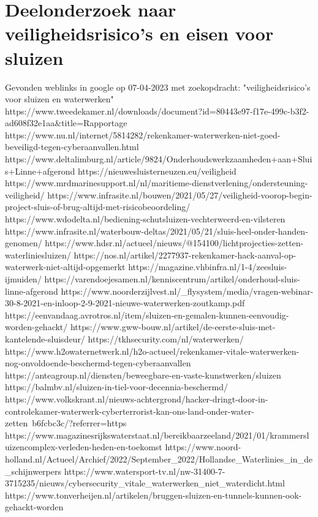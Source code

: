 \chapter{Deelonderzoek naar veiligheidsrisico's en eisen voor sluizen}

Gevonden weblinks in google op 07-04-2023 met zoekopdracht: "veiligheidsrisico's voor sluizen en waterwerken"
https://www.tweedekamer.nl/downloads/document?id=80443e97-f17e-499c-b3f2-ad608f32e1aa&title=Rapportage%
https://www.nu.nl/internet/5814282/rekenkamer-waterwerken-niet-goed-beveiligd-tegen-cyberaanvallen.html
https://www.deltalimburg.nl/article/9824/Onderhoudswerkzaamheden+aan+Sluis+Linne+afgerond
https://nieuwesluisterneuzen.eu/veiligheid
https://www.mrdmarinesupport.nl/nl/maritieme-dienstverlening/ondersteuning-veiligheid/
https://www.infrasite.nl/bouwen/2021/05/27/veiligheid-voorop-begin-project-sluis-of-brug-altijd-met-risicobeoordeling/
https://www.wdodelta.nl/bediening-schutsluizen-vechterweerd-en-vilsteren
https://www.infrasite.nl/waterbouw-deltas/2021/05/21/sluis-heel-onder-handen-genomen/
https://www.hdsr.nl/actueel/nieuws/@154100/lichtprojecties-zetten-waterliniesluizen/
https://nos.nl/artikel/2277937-rekenkamer-hack-aanval-op-waterwerk-niet-altijd-opgemerkt
https://magazine.vhbinfra.nl/1-4/zeesluis-ijmuiden/
https://varendoejesamen.nl/kenniscentrum/artikel/onderhoud-sluis-linne-afgerond
https://www.noorderzijlvest.nl/_flysystem/media/vragen-webinar-30-8-2021-en-inloop-2-9-2021-nieuwe-waterwerken-zoutkamp.pdf
https://eenvandaag.avrotros.nl/item/sluizen-en-gemalen-kunnen-eenvoudig-worden-gehackt/
https://www.gww-bouw.nl/artikel/de-eerste-sluis-met-kantelende-sluisdeur/
https://tkhsecurity.com/nl/waterwerken/
https://www.h2owaternetwerk.nl/h2o-actueel/rekenkamer-vitale-waterwerken-nog-onvoldoende-beschermd-tegen-cyberaanvallen
https://anteagroup.nl/diensten/beweegbare-en-vaste-kunstwerken/sluizen
https://balmbv.nl/sluizen-in-tiel-voor-decennia-beschermd/
https://www.volkskrant.nl/nieuws-achtergrond/hacker-dringt-door-in-controlekamer-waterwerk-cyberterrorist-kan-ons-land-onder-water-zetten~b6fcbc3c/?referrer=https%
https://www.magazinesrijkswaterstaat.nl/bereikbaarzeeland/2021/01/krammersluizencomplex-verleden-heden-en-toekomst
https://www.noord-holland.nl/Actueel/Archief/2022/September_2022/Hollandse_Waterlinies_in_de_schijnwerpers
https://www.watersport-tv.nl/nw-31400-7-3715235/nieuws/cybersecurity_vitale_waterwerken_niet_waterdicht.html
https://www.tonverheijen.nl/artikelen/bruggen-sluizen-en-tunnels-kunnen-ook-gehackt-worden
